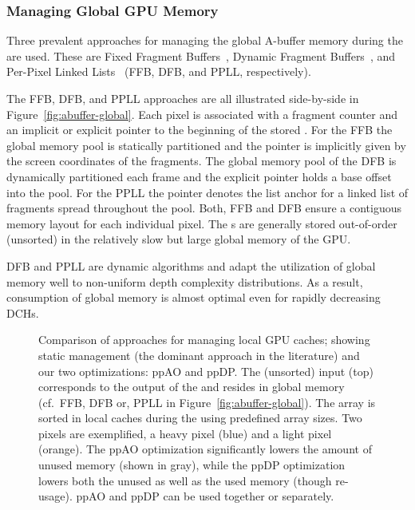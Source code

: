 \documentclass{egpubl}
\newcommand{\ab}{\mbox{A-buffer}}
\newcommand{\dch}{DCH}
\newcommand{\stencil}{ppAO}
\newcommand{\dloop}{ppDP}
\begin{document}
\subsubsection*{Managing Global GPU Memory}

Three prevalent approaches for managing the global \ab{} memory during the \sFill{} are used.
These are Fixed Fragment Buffers~\cite{Crassin2010}, Dynamic Fragment Buffers~\cite{Maule2012}, and Per-Pixel Linked Lists~\cite{kainz2009ray,Yang2010,Crassin2010} (FFB, DFB, and PPLL, respectively). 

The FFB, DFB, and PPLL approaches are all illustrated side-by-side in Figure~\ref{fig:abuffer-global}.  
Each pixel is associated with a fragment counter and an implicit or explicit pointer to the beginning of the stored \bFraglist. 
For the FFB the global memory pool is statically partitioned and the pointer is implicitly given by the screen coordinates of the fragments. 
The global memory pool of the DFB is dynamically partitioned each frame and the explicit pointer holds a base offset into the pool. 
For the PPLL the pointer denotes the list anchor for a linked list of fragments spread throughout the pool. 
Both, FFB and DFB ensure a contiguous memory layout for each individual pixel. 
The \bFraglist s are generally stored out-of-order (unsorted) in the relatively slow but large global memory of the GPU.

DFB and PPLL are dynamic algorithms and adapt the utilization of global memory well to non-uniform depth complexity distributions. 
As a result, consumption of global memory is almost optimal even for rapidly decreasing \dch{}s. 


\begin{figure}[t]
  \centering
  \def\svgwidth{\textwidth}%
  \graphicspath{{figures/}}%
  {\sffamily\footnotesize}
  \caption{\label{fig:abuffer-local} %
    Comparison of approaches for managing local GPU caches; showing static management (the dominant approach in the literature) and our two optimizations: \stencil{} and \dloop{}.
    The (unsorted) input \bFraglist{} (top) corresponds to the output of the \sFill{} and resides in global memory (cf.\ FFB, DFB or, PPLL in Figure~\ref{fig:abuffer-global}). 
    The array is sorted  in local caches during the \sResolve{} using predefined array sizes. 
    Two pixels are exemplified, a heavy pixel (blue) and a light pixel (orange). 
    The \stencil{} optimization significantly lowers the amount of unused memory (shown in gray), while the \dloop{} optimization lowers both the unused as well as the used memory (though re-usage). 
    \stencil{} and \dloop{} can be used together or separately.
  }
\end{figure}
\end{document}
